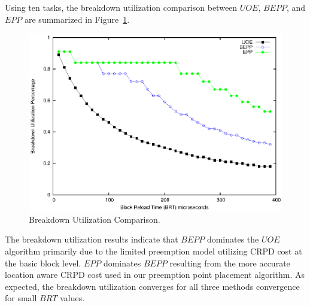 Using ten tasks, the breakdown utilization comparison between ${UOE}$, ${BEPP}$, and ${EPP}$ are summarized in Figure~\ref{fig:breakdown_utilization}.
\begin{figure}[h!]
\vspace{-10pt}
\begin{center}
\includegraphics[width=\linewidth]{eps/breakdown.eps}
\caption{Breakdown Utilization Comparison.}
\label{fig:breakdown_utilization}
\end{center}
\vspace{-10pt}
\end{figure}
The breakdown utilization results indicate that $BEPP$ dominates the $UOE$ algorithm primarily due to the limited preemption model utilizing CRPD cost at the basic block level.  $EPP$ dominates $BEPP$ resulting from the more accurate location aware CRPD cost used in our preemption point placement algorithm.  As expected, the breakdown utilization converges for all three methods convergence for small ${BRT}$ values.
